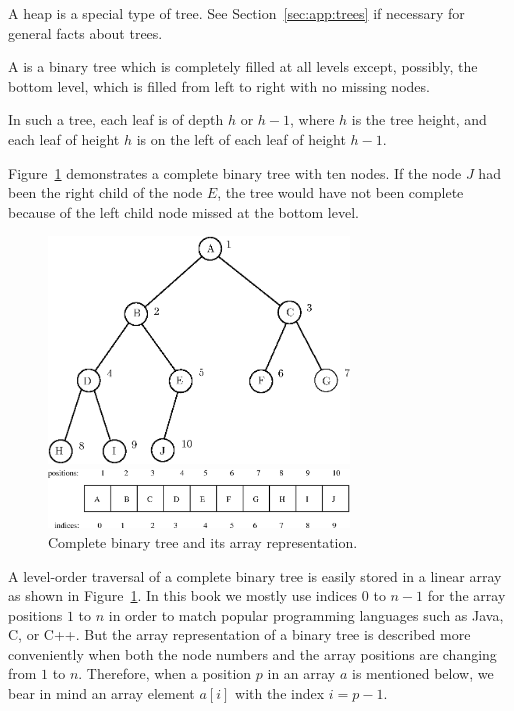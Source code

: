 A heap is a special type of tree. 
See Section~\ref{sec:app:trees} if necessary for general facts about trees.

\begin{Definition}
A  is a binary tree which is completely filled 
at all levels except, possibly, the bottom level, which is filled from left to
right with no missing nodes.
\end{Definition}

In such a tree, each leaf is of depth $h$ or $h-1$, where $h$ is the tree height, 
and each leaf of height $h$ is on the left of each leaf of height $h-1$.

\begin{Example} Figure~\ref{tree-fig} demonstrates a complete binary tree with 
ten nodes. If the node $J$ had been the right child of the node $E$, the
tree would have not been complete because of the left child node missed at the 
bottom level.
\end{Example}       
           
                                                
\begin{figure}[htb!]
\centerline{\includegraphics[width=80mm]{figs/tree-figTop.eps}}
\centerline{\includegraphics[width=80mm]{figs/tree-figBottom.eps}}
\caption{Complete binary tree and its array representation.}
\label{tree-fig} 
\end{figure}

A level-order traversal of a complete binary tree is easily stored
in a linear array as shown in Figure~\ref{tree-fig}. In this book 
we mostly use indices $0$ to $n-1$ for the array positions $1$ to $n$ 
in order to match popular programming languages such as Java, C, or C++. 
But the array representation of a binary tree is 
described more conveniently when both
the node numbers and the array positions are changing
from $1$ to $n$. Therefore, when a position $p$ in an array $a$
is mentioned below, we bear in mind 
an array element $a[i]$ with the index $i=p-1$.

